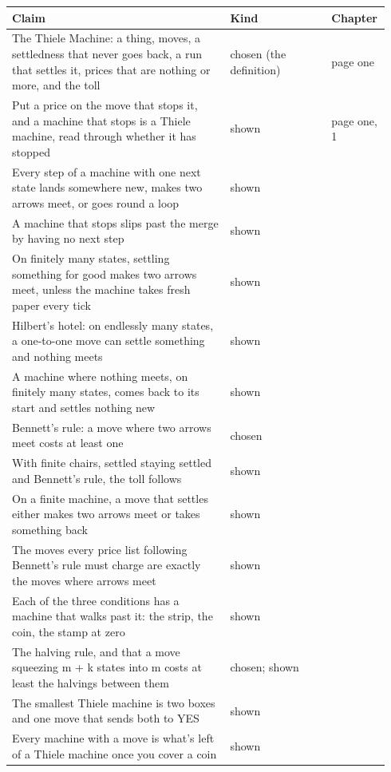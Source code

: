 \documentclass[11pt,twoside]{article}
\theoremstyle{thielethm}
\theoremstyle{thieledef}
\theoremstyle{thieledef}
\theoremstyle{thieledef}
\theoremstyle{thielethm}
\theoremstyle{thieleobs}
\theoremstyle{thielethm}
\begin{document}
\begingroup\small
\begin{longtable}{@{}>{\raggedright\arraybackslash}p{0.56\linewidth}>{\raggedright\arraybackslash}p{0.26\linewidth}>{\raggedright\arraybackslash}p{0.12\linewidth}@{}}
\toprule
\textbf{Claim} & \textbf{Kind} & \textbf{Chapter} \\
\midrule
\endhead
\bottomrule
\endlastfoot
The Thiele Machine: a thing, moves, a settledness that never goes back, a run that settles it, prices that are nothing or more, and the toll & chosen (the definition) & page one \\
Put a price on the move that stops it, and a machine that stops is a Thiele machine, read through whether it has stopped & shown & page one, 1 \\
Every step of a machine with one next state lands somewhere new, makes two arrows meet, or goes round a loop & shown & 1 \\
A machine that stops slips past the merge by having no next step & shown & 1 \\
On finitely many states, settling something for good makes two arrows meet, unless the machine takes fresh paper every tick & shown & 2 \\
Hilbert's hotel: on endlessly many states, a one-to-one move can settle something and nothing meets & shown & 2 \\
A machine where nothing meets, on finitely many states, comes back to its start and settles nothing new & shown & 2 \\
Bennett's rule: a move where two arrows meet costs at least one & chosen & 3 \\
With finite chairs, settled staying settled and Bennett's rule, the toll follows & shown & 3 \\
On a finite machine, a move that settles either makes two arrows meet or takes something back & shown & 3 \\
The moves every price list following Bennett's rule must charge are exactly the moves where arrows meet & shown & 3 \\
Each of the three conditions has a machine that walks past it: the strip, the coin, the stamp at zero & shown & 3 \\
The halving rule, and that a move squeezing m + k states into m costs at least the halvings between them & chosen; shown & 3 \\
The smallest Thiele machine is two boxes and one move that sends both to YES & shown & 4 \\
Every machine with a move is what's left of a Thiele machine once you cover a coin & shown & 4 \\

\end{longtable}
\end{document}
